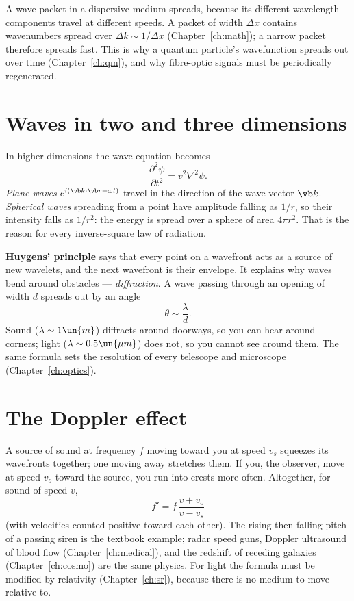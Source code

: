 A wave packet in a dispersive medium spreads, because its different wavelength components travel at different speeds. A packet of width $\Delta x$ contains wavenumbers spread over $\Delta k\sim 1/\Delta x$ (Chapter~\ref{ch:math}); a narrow packet therefore spreads fast. This is why a quantum particle's wavefunction spreads out over time (Chapter~\ref{ch:qm}), and why fibre-optic signals must be periodically regenerated.

\section{Waves in two and three dimensions}

In higher dimensions the wave equation becomes
\[
  \frac{\partial^2\psi}{\partial t^2} = v^2\nabla^2\psi .
\]
\emph{Plane waves} $e^{i(\vb k\cdot\vb r - \omega t)}$ travel in the direction of the wave vector $\vb k$. \emph{Spherical waves} spreading from a point have amplitude falling as $1/r$, so their intensity falls as $1/r^2$: the energy is spread over a sphere of area $4\pi r^2$. That is the reason for every inverse-square law of radiation.

\textbf{Huygens' principle} says that every point on a wavefront acts as a source of new wavelets, and the next wavefront is their envelope. It explains why waves bend around obstacles --- \emph{diffraction}. A wave passing through an opening of width $d$ spreads out by an angle
\[
  \theta \sim \frac{\lambda}{d}.
\]
Sound ($\lambda\sim1\un{m}$) diffracts around doorways, so you can hear around corners; light ($\lambda\sim0.5\un{\mu m}$) does not, so you cannot see around them. The same formula sets the resolution of every telescope and microscope (Chapter~\ref{ch:optics}).

\section{The Doppler effect}

A source of sound at frequency $f$ moving toward you at speed $v_s$ squeezes its wavefronts together; one moving away stretches them. If you, the observer, move at speed $v_o$ toward the source, you run into crests more often. Altogether, for sound of speed $v$,
\[
  f' = f\,\frac{v + v_o}{v - v_s}
\]
(with velocities counted positive toward each other). The rising-then-falling pitch of a passing siren is the textbook example; radar speed guns, Doppler ultrasound of blood flow (Chapter~\ref{ch:medical}), and the redshift of receding galaxies (Chapter~\ref{ch:cosmo}) are the same physics. For light the formula must be modified by relativity (Chapter~\ref{ch:sr}), because there is no medium to move relative to.

